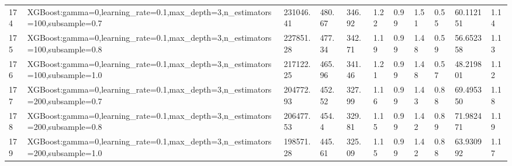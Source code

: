 \begin{longtable}{C{0.8cm} L{2cm} C{1.15cm} C{1.15cm} C{1.15cm} C{1.15cm} C{0.85cm} C{1.25cm} C{1.2cm} C{1.5cm} C{1.0cm}}
174 & XGBoost:\newline gamma=0,\newline learning\_rate=0.1,\newline max\_depth=3,\newline n\_estimators=100,\newline subsample=0.7 & 231046.41 & 480.67 & 346.92 & 1.22 & 0.99 & 1.51 & 0.55 & 60.112151 & 1.14 \\
175 & XGBoost:\newline gamma=0,\newline learning\_rate=0.1,\newline max\_depth=3,\newline n\_estimators=100,\newline subsample=0.8 & 227851.28 & 477.34 & 342.71 & 1.19 & 0.99 & 1.48 & 0.59 & 56.652358 & 1.13 \\
176 & XGBoost:\newline gamma=0,\newline learning\_rate=0.1,\newline max\_depth=3,\newline n\_estimators=100,\newline subsample=1.0 & 217122.25 & 465.96 & 341.46 & 1.21 & 0.99 & 1.48 & 0.57 & 48.219801 & 1.12 \\
177 & XGBoost:\newline gamma=0,\newline learning\_rate=0.1,\newline max\_depth=3,\newline n\_estimators=200,\newline subsample=0.7 & 204772.93 & 452.52 & 327.99 & 1.16 & 0.99 & 1.43 & 0.88 & 69.495350 & 1.18 \\
178 & XGBoost:\newline gamma=0,\newline learning\_rate=0.1,\newline max\_depth=3,\newline n\_estimators=200,\newline subsample=0.8 & 206477.53 & 454.4 & 329.81 & 1.15 & 0.99 & 1.42 & 0.89 & 71.982471 & 1.19 \\
179 & XGBoost:\newline gamma=0,\newline learning\_rate=0.1,\newline max\_depth=3,\newline n\_estimators=200,\newline subsample=1.0 & 198571.28 & 445.61 & 325.09 & 1.15 & 0.99 & 1.42 & 0.88 & 63.930992 & 1.17 \\

\end{longtable}
